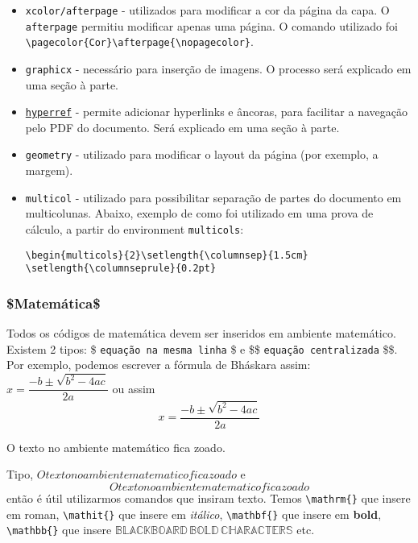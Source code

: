 \documentclass[12pt,a4paper]{article}
\begin{document}
\begin{itemize}
\item \texttt{xcolor/afterpage} - utilizados para modificar a cor da página da capa. O \texttt{afterpage} permitiu modificar apenas uma página. O comando utilizado foi \texttt{\textbackslash pagecolor\{Cor\}\textbackslash afterpage\{\textbackslash nopagecolor\}}.

\item \texttt{graphicx} - necessário para inserção de imagens. O processo será explicado em uma seção à parte.

\item \texttt{\hyperlink{ops}{hyperref}} - permite adicionar hyperlinks e \hypertarget{botao}{âncoras}, para facilitar a navegação pelo PDF do documento. Será explicado em uma seção à parte.

\item \texttt{geometry} - utilizado para modificar o layout da página (por exemplo, a margem).

\item \texttt{multicol} - utilizado para possibilitar separação de partes do documento em multicolunas. Abaixo, exemplo de como foi utilizado em uma prova de cálculo, a partir do environment \texttt{multicols}:

\footnotesize \texttt{\textbackslash begin\{multicols\}\{2\}\textbackslash setlength\{\textbackslash columnsep\}\{1.5cm\}
\textbackslash setlength\{\textbackslash columnseprule\}\{0.2pt\}}
\normalsize

\end{itemize}

\subsubsection{\$Matemática\$}

Todos os códigos de matemática devem ser inseridos em ambiente matemático. Existem 2 tipos: \$ \texttt{equação na mesma linha} \$ e \$\$ \texttt{equação centralizada} \$\$. Por exemplo, podemos escrever a fórmula de Bháskara assim: $x = \dfrac{-b \pm \sqrt{b^2 - 4ac}}{2a}$ ou assim $$x = \dfrac{-b \pm \sqrt{b^2 - 4ac}}{2a}$$

O texto no ambiente matemático fica zoado. 

Tipo, $O texto no ambiente matematico fica zoado$ e $$O texto no ambiente matematico fica zoado$$ então é útil utilizarmos comandos que insiram texto. Temos \texttt{\textbackslash mathrm\{\}} que insere em roman, \texttt{\textbackslash mathit\{\}} que insere em \textit{itálico}, \texttt{\textbackslash mathbf\{\}} que insere em \textbf{bold}, \texttt{\textbackslash mathbb\{\}} que insere $\mathbb{BLACKBOARD\, BOLD\, CHARACTERS}$ etc.
\end{document}
